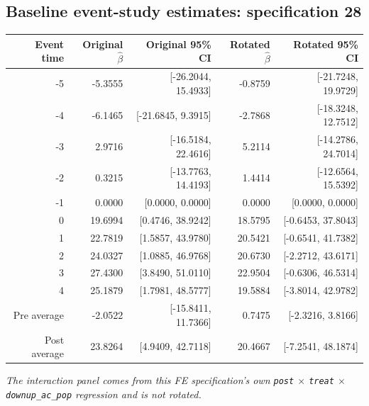 \documentclass[10pt]{article}
\begin{document}
\subsection*{Baseline event-study estimates: specification 28}
\begin{center}
\scriptsize
\begin{tabular}{r rr rr}
\toprule
Event time & Original $\hat\beta$ & Original 95\% CI & Rotated $\hat\beta$ & Rotated 95\% CI \\
\midrule
-5 & -5.3555 & [-26.2044, 15.4933] & -0.8759 & [-21.7248, 19.9729] \\
-4 & -6.1465 & [-21.6845, 9.3915] & -2.7868 & [-18.3248, 12.7512] \\
-3 & 2.9716 & [-16.5184, 22.4616] & 5.2114 & [-14.2786, 24.7014] \\
-2 & 0.3215 & [-13.7763, 14.4193] & 1.4414 & [-12.6564, 15.5392] \\
-1 & 0.0000 & [0.0000, 0.0000] & 0.0000 & [0.0000, 0.0000] \\
0 & 19.6994 & [0.4746, 38.9242] & 18.5795 & [-0.6453, 37.8043] \\
1 & 22.7819 & [1.5857, 43.9780] & 20.5421 & [-0.6541, 41.7382] \\
2 & 24.0327 & [1.0885, 46.9768] & 20.6730 & [-2.2712, 43.6171] \\
3 & 27.4300 & [3.8490, 51.0110] & 22.9504 & [-0.6306, 46.5314] \\
4 & 25.1879 & [1.7981, 48.5777] & 19.5884 & [-3.8014, 42.9782] \\
\midrule
Pre average & -2.0522 & [-15.8411, 11.7366] & 0.7475 & [-2.3216, 3.8166] \\
Post average & 23.8264 & [4.9409, 42.7118] & 20.4667 & [-7.2541, 48.1874] \\
\bottomrule
\end{tabular}
\end{center}
\medskip
\textit{The interaction panel comes from this FE specification's own \texttt{post} $\times$ \texttt{treat} $\times$ \texttt{downup\_ac\_pop} regression and is not rotated.}
\clearpage
\end{document}
